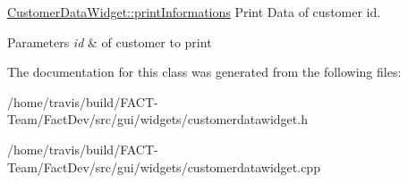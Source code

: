 \hyperlink{classGui_1_1Widgets_1_1CustomerDataWidget_aa995ed95c5ca119db4258af2fe403691}{Customer\-Data\-Widget\-::print\-Informations} Print Data of customer id. 


\begin{DoxyParams}{Parameters}
{\em id} & of customer to print \\
\hline
\end{DoxyParams}


The documentation for this class was generated from the following files\-:\begin{DoxyCompactItemize}
\item 
/home/travis/build/\-F\-A\-C\-T-\/\-Team/\-Fact\-Dev/src/gui/widgets/customerdatawidget.\-h\item 
/home/travis/build/\-F\-A\-C\-T-\/\-Team/\-Fact\-Dev/src/gui/widgets/customerdatawidget.\-cpp\end{DoxyCompactItemize}
